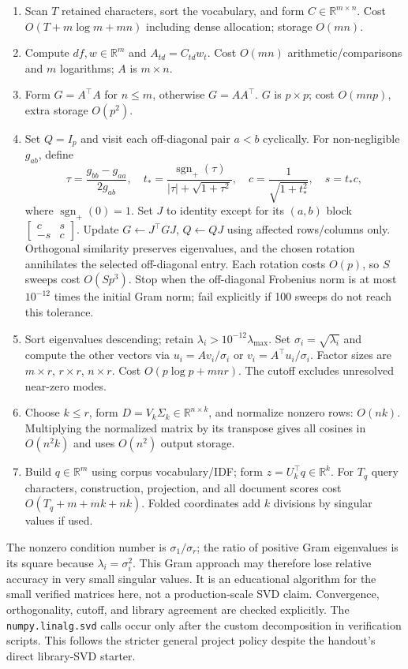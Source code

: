 \documentclass[11pt]{article}
\newcommand{\R}{\mathbb{R}}
\begin{document}
\begin{enumerate}
\item Scan $T$ retained characters, sort the vocabulary, and form
$C\in\R^{m\times n}$. Cost $O(T+m\log m+mn)$ including dense allocation;
storage $O(mn)$.
\item Compute $df,w\in\R^m$ and $A_{td}=C_{td}w_t$.
Cost $O(mn)$ arithmetic/comparisons and $m$ logarithms; $A$ is $m\times n$.
\item Form $G=A^\top A$ for $n\le m$, otherwise $G=AA^\top$.
$G$ is $p\times p$; cost $O(mnp)$, extra storage $O(p^2)$.
\item Set $Q=I_p$ and visit each off-diagonal pair $a<b$ cyclically. For
non-negligible $g_{ab}$, define
\[
\tau=\frac{g_{bb}-g_{aa}}{2g_{ab}},\quad
t_*=\frac{\operatorname{sgn}_+(\tau)}{|\tau|+\sqrt{1+\tau^2}},\quad
c=\frac1{\sqrt{1+t_*^2}},\quad s=t_*c,
\]
where $\operatorname{sgn}_+(0)=1$. Set $J$ to identity except for its $(a,b)$
block $\begin{bmatrix}c&s\\-s&c\end{bmatrix}$. Update
$G\leftarrow J^\top GJ$, $Q\leftarrow QJ$ using affected rows/columns only.
Orthogonal similarity preserves eigenvalues, and the chosen rotation annihilates
the selected off-diagonal entry. Each rotation costs $O(p)$, so $S$ sweeps cost
$O(Sp^3)$. Stop when the off-diagonal Frobenius norm is at most $10^{-12}$ times
the initial Gram norm; fail explicitly if 100 sweeps do not reach this tolerance.
\item Sort eigenvalues descending; retain $\lambda_i>10^{-12}\lambda_{\max}$.
Set $\sigma_i=\sqrt{\lambda_i}$ and compute the other vectors via
$u_i=Av_i/\sigma_i$ or $v_i=A^\top u_i/\sigma_i$.
Factor sizes are $m\times r$, $r\times r$, $n\times r$.
Cost $O(p\log p+mnr)$. The cutoff excludes unresolved near-zero modes.
\item Choose $k\le r$, form $D=V_k\Sigma_k\in\R^{n\times k}$, and normalize
nonzero rows: $O(nk)$. Multiplying the normalized matrix by its transpose gives
all cosines in $O(n^2k)$ and uses $O(n^2)$ output storage.
\item Build $q\in\R^m$ using corpus vocabulary/IDF; form $z=U_k^\top q\in\R^k$.
For $T_q$ query characters, construction, projection, and all document scores cost
$O(T_q+m+mk+nk)$. Folded coordinates add $k$ divisions by singular values if used.
\end{enumerate}
The nonzero condition number is $\sigma_1/\sigma_r$; the ratio of positive Gram
eigenvalues is its square because $\lambda_i=\sigma_i^2$.
This Gram approach may therefore lose relative
accuracy in very small singular values. It is an educational algorithm for the
small verified matrices here, not a production-scale SVD claim. Convergence,
orthogonality, cutoff, and library agreement are checked explicitly. The
\texttt{numpy.linalg.svd} calls occur only after the custom decomposition in
verification scripts. This follows the stricter general project policy despite
the handout's direct library-SVD starter.
\end{document}
